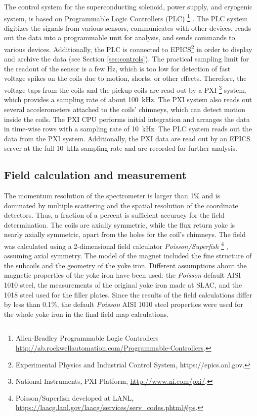 The control system for the superconducting solenoid, power supply, 
and cryogenic system, is based on Programmable Logic
Controllers (PLC)%
\footnote{
  Allen-Bradley Programmable Logic Controllers
  \url{http://ab.rockwellautomation.com/Programmable-Controllers}.
}%
.
The PLC system digitizes the signals from various sensors, communicates with
other devices, reads out the data into a programmable unit for
analysis, and sends commands to various devices. Additionally, the PLC is
connected to EPICS\footnote{Experimental Physics and 
Industrial Control System, https://epics.anl.gov.} in order to display and archive the data (see
Section \ref{sec:controls}).  The practical sampling limit for the readout of the sensor
is a few Hz, which is too low for
detection of fast voltage spikes on the coils due to motion, shorts,
or other effects. Therefore, the voltage taps from the coils
and the pickup coils are read
out by a PXI%
\footnote{
  National Instruments, PXI Platform, \url{http://www.ni.com/pxi/}.
}%
system, which provides a sampling rate of about 100~kHz. The
PXI system also reads out several accelerometers attached to the
coils' chimneys, which can detect motion inside the coils. The PXI
CPU performs initial integration and arranges the data in time-wise
rows with a sampling rate of 10~kHz.  The PLC system reads out the
data from the PXI system. Additionally, the PXI data are read out by
an EPICS server at the full 10~kHz sampling rate and are recorded for further analysis.

\subsection[Field calculation and measurement]{
         Field calculation and measurement
        \label{sec:sol:field}
}

The momentum resolution of the \gx{} spectrometer is larger than
1\% and is dominated by multiple scattering and the spatial
resolution of the coordinate detectors.  Thus, a fraction of a percent is
sufficient accuracy for the field determination.  The coils are
axially symmetric, while the flux return yoke is nearly axially
symmetric, apart from the holes for the coil's chimneys. The field was
calculated using a 2-dimensional field calculator {\it
  Poisson/Superfish}%
\footnote{
   Poisson/Superfish developed at LANL,
   \url{https://laacg.lanl.gov/laacg/services/serv_codes.phtml\#ps}.
} 
, assuming axial symmetry.  The model of the magnet included the
fine structure of the subcoils and the geometry of the yoke
iron. Different assumptions about the magnetic properties of the yoke
iron have been used: the {\it Poisson} default AISI 1010 steel, the
measurements of the original yoke iron made at SLAC, and the 1018
steel used for the filler plates. Since the results of the field
calculations differ by less than 0.1\%, the default {\it Poisson} AISI
1010 steel properties were used for the whole yoke iron in the final
field map calculations.

